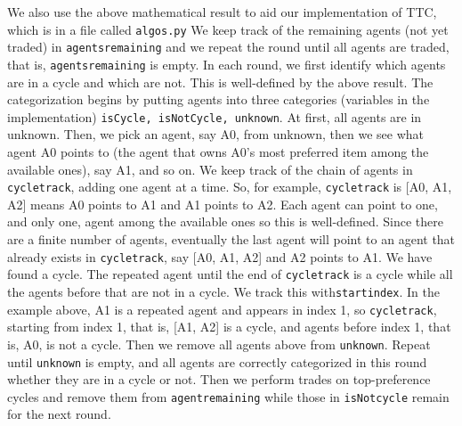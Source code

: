 \documentclass[12pt]{article}
\begin{document}
We also use the above mathematical result to aid our implementation of TTC, which is in a file called \texttt{algos.py} We keep track of the remaining agents (not yet traded) in \texttt{agents\textunderscore remaining} and we repeat the round until all agents are traded, that is, \texttt{agents\textunderscore remaining} is empty. In each round, we first identify which agents are in a cycle and which are not. This is well-defined by the above result. The categorization begins by putting agents into three categories (variables in the implementation) \texttt{isCycle, isNotCycle, unknown}. At first, all agents are in unknown. Then, we pick an agent, say A0, from unknown, then we see what agent A0 points to (the agent that owns A0's most preferred item among the available ones), say A1, and so on. We keep track of
 the chain of agents in \texttt{cycle\textunderscore track}, adding one agent at a time. So, for example, \texttt{cycle\textunderscore track} is [A0, A1, A2]
means A0 points to A1 and A1 points to A2. Each agent can point to one, and only one, agent among the available ones so this is well-defined. Since there are a finite number of agents, eventually the last agent will point to an agent that already exists in \texttt{cycle\textunderscore track}, say [A0, A1, A2] and A2 points to A1. We have found a cycle. The repeated agent until the end of \texttt{cycle\textunderscore track} is a cycle while all the agents before that are not in a cycle. We track this with\texttt{start\textunderscore index}. In the example above, A1 is  a repeated agent and appears in index 1, so \texttt{cycle\textunderscore track}, starting from index 1, that is, [A1, A2] is a cycle, and agents before index 1, that is, A0, is not a cycle. Then we remove all agents above from \texttt{unknown}. Repeat until \texttt{unknown} is empty, and all agents are correctly categorized in this round whether they are in a cycle or not. Then we perform trades on top-preference cycles and remove them from \texttt{agent\textunderscore remaining} while those in \texttt{isNotcycle} remain for the next round.

\end{document}
